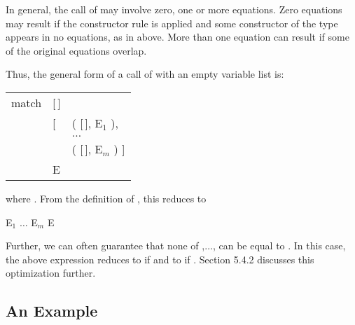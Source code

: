 In general, the call of  may involve zero, one or more equations. Zero equations may result if the constructor rule is applied and some constructor of the type appears in no equations, as in  above. More than one equation can result if some of the original equations overlap.

Thus, the general form of a call of  with an empty variable list is:
\begin{mlcoded}
    \setlength{\tabcolsep}{0.1em}
    \begin{tabular}{rll}
        match &[\,]& \\
    &[ &( [\,], E$_1$ ), \\
    && $\ldots$\\
    &&( [\,], E$_m$ ) ]\\
    &E
    \end{tabular}
\end{mlcoded}
where . From the definition of , this reduces to
\begin{mlcoded}
    E$_1$ \fatbar{} $\ldots$ \fatbar{} E$_m$ \fatbar{} E
\end{mlcoded}
Further, we can often guarantee that none of ,$\ldots$,  can be equal to . In this case, the above  expression reduces to  if  and to  if . Section 5.4.2 discusses this optimization further.

\subsection{An Example}


